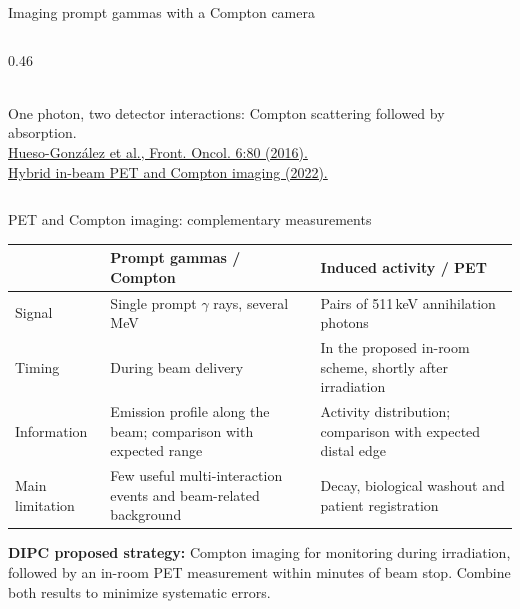 \documentclass[aspectratio=169,11pt]{beamer}
\begin{document}
\begin{frame}{Imaging prompt gammas with a Compton camera}
\begin{columns}[T]
\begin{column}{0.46\textwidth}
{}\\[2mm]
      {\scriptsize\color{crGrey} One photon, two detector interactions:
       Compton scattering followed by absorption.}\\[3mm]
      {\tiny\color{crGrey}
       \href{https://doi.org/10.3389/fonc.2016.00080}
       {Hueso-Gonz\'alez et al., Front. Oncol. 6:80 (2016).}\\
       \href{https://arxiv.org/abs/2202.06556}
       {Hybrid in-beam PET and Compton imaging (2022).}}
    \end{column}
  \end{columns}
\end{frame}


\begin{frame}{PET and Compton imaging: complementary measurements}
\small
\renewcommand{\arraystretch}{1.22}
\begin{tabular}{@{}>{\raggedright\arraybackslash}p{}>{\raggedright\arraybackslash}p{}>{\raggedright\arraybackslash}p{}@{}}
\toprule
 & \textbf{Prompt gammas / Compton} & \textbf{Induced activity / PET}\\
\midrule
Signal & Single prompt $\gamma$ rays, several MeV & Pairs of 511\,keV annihilation photons\\
Timing & During beam delivery & In the proposed in-room scheme, shortly after irradiation\\
Information & Emission profile along the beam; comparison with expected range & Activity distribution; comparison with expected distal edge\\
Main limitation & Few useful multi-interaction events and beam-related background & Decay, biological washout and patient registration\\
\bottomrule
\end{tabular}
\par\vspace{5mm}
\textbf{DIPC proposed strategy:} Compton imaging for monitoring during irradiation, followed by an in-room PET measurement within minutes of beam stop. Combine both results to minimize systematic errors.
\end{frame}
\end{document}
